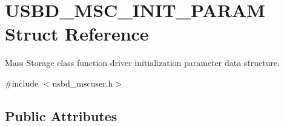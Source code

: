 \hypertarget{struct_u_s_b_d___m_s_c___i_n_i_t___p_a_r_a_m}{}\section{U\+S\+B\+D\+\_\+\+M\+S\+C\+\_\+\+I\+N\+I\+T\+\_\+\+P\+A\+R\+AM Struct Reference}
\label{struct_u_s_b_d___m_s_c___i_n_i_t___p_a_r_a_m}


Mass Storage class function driver initialization parameter data structure.  




{\ttfamily \#include $<$usbd\+\_\+mscuser.\+h$>$}

\subsection*{Public Attributes}
